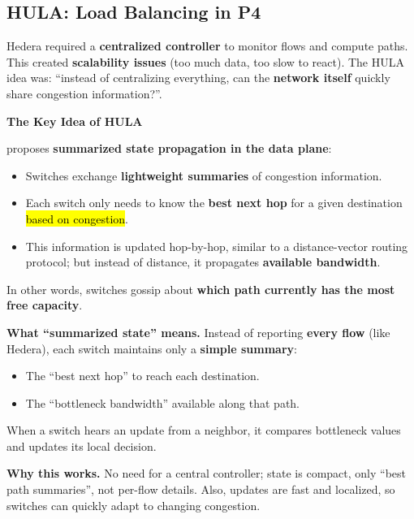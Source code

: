 \subsection{HULA: Load Balancing in P4}\label{subsection: HULA - Load Balancing in P4}

Hedera required a \textbf{centralized controller} to monitor flows and compute paths. This created \textbf{scalability issues} (too much data, too slow to react). The HULA idea was: ``instead of centralizing everything, can the \textbf{network itself} quickly share congestion information?''.

\highspace
\begin{flushleft}
    \textcolor{Green3}{ \textbf{The Key Idea of HULA}}
\end{flushleft}
\cite{katta2016hula} proposes \textbf{summarized state propagation in the data plane}:
\begin{itemize}
    \item Switches exchange \textbf{lightweight summaries} of congestion information.
    \item Each switch only needs to know the \textbf{best next hop} for a given destination \hl{based on congestion}.
    \item This information is updated hop-by-hop, similar to a distance-vector routing protocol; but instead of distance, it propagates \textbf{available bandwidth}.
\end{itemize}
In other words, switches gossip about \textbf{which path currently has the most free capacity}.

\highspace
\textcolor{Green3}{ \textbf{What ``summarized state'' means.}} Instead of reporting \textbf{every flow} (like Hedera), each switch maintains only a \textbf{simple summary}:
\begin{itemize}
    \item The ``best next hop'' to reach each destination.
    \item The ``bottleneck bandwidth'' available along that path.
\end{itemize}
When a switch hears an update from a neighbor, it compares bottleneck values and updates its local decision.

\highspace
\textcolor{Green3}{ \textbf{Why this works.}} No need for a central controller; state is compact, only ``best path summaries'', not per-flow details. Also, updates are fast and localized, so switches can quickly adapt to changing congestion.

